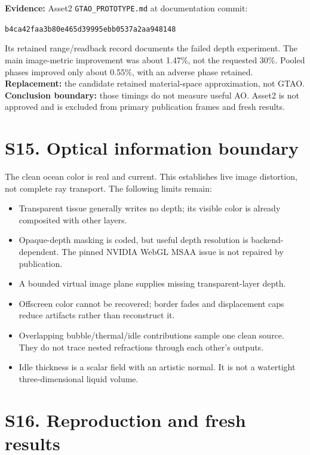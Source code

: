 \documentclass[
  english,
  11pt,
]{article}
\providecommand{\tightlist}{%
  \setlength{\itemsep}{0pt}\setlength{\parskip}{0pt}}
\begin{document}
\textbf{Evidence:} Asset2 \texttt{GTAO\_PROTOTYPE.md} at documentation
commit:

\texttt{b4ca42faa3b80e465d39995ebb0537a2aa948148}

Its retained range/readback record documents the failed depth
experiment. The main image-metric improvement was about 1.47\%, not the
requested 30\%. Pooled phases improved only about 0.55\%, with an
adverse phase retained. \textbf{Replacement:} the candidate retained
material-space approximation, not GTAO. \textbf{Conclusion boundary:}
those timings do not measure useful AO. Asset2 is not approved and is
excluded from primary publication frames and fresh results.

\section{S15. Optical information
boundary}\label{s15.-optical-information-boundary}

The clean ocean color is real and current. This establishes live image
distortion, not complete ray transport. The following limits remain:

\begin{itemize}
\tightlist
\item
  Transparent tissue generally writes no depth; its visible color is
  already composited with other layers.
\item
  Opaque-depth masking is coded, but useful depth resolution is backend-
  dependent. The pinned NVIDIA WebGL MSAA issue is not repaired by
  publication.
\item
  A bounded virtual image plane supplies missing transparent-layer
  depth.
\item
  Offscreen color cannot be recovered; border fades and displacement
  caps reduce artifacts rather than reconstruct it.
\item
  Overlapping bubble/thermal/idle contributions sample one clean source.
  They do not trace nested refractions through each other's outputs.
\item
  Idle thickness is a scalar field with an artistic normal. It is not a
  watertight three-dimensional liquid volume.
\end{itemize}

\section{S16. Reproduction and fresh
results}\label{s16.-reproduction-and-fresh-results}
\end{document}
